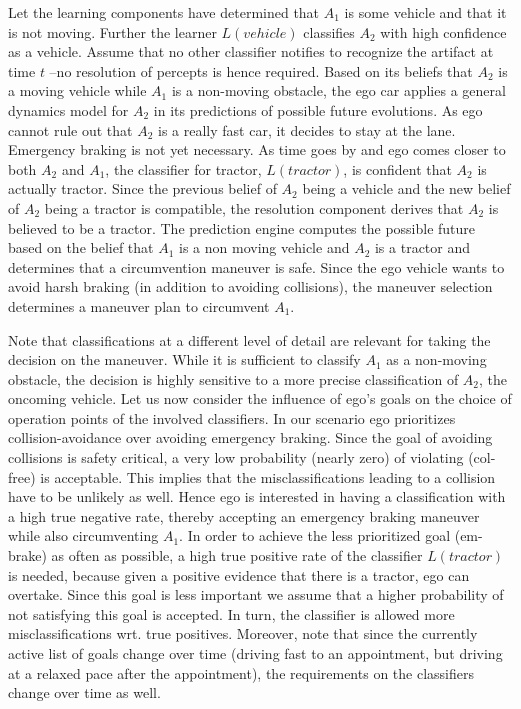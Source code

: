 Let the learning components have determined
 that $A_1$ is some vehicle and that it is not moving. 
Further the learner $L(vehicle)$ classifies $A_2$  with high confidence as a vehicle. Assume that no other classifier notifies to recognize the artifact at time $t$ --no resolution of percepts is hence required. 
Based on its beliefs that $A_2$ is a moving vehicle while $A_1$ is a non-moving obstacle, the ego car applies a general dynamics model for $A_2$ in its predictions of possible future evolutions. As ego cannot rule out that $A_2$ is a really fast car, it decides to stay at the lane. Emergency braking is not yet necessary. As time goes by and ego comes closer to both $A_2$ and $A_1$, the classifier for tractor, $L (tractor)$, is confident that  $A_2$ is actually tractor.
Since the previous belief of $A_2$ being a vehicle and the new belief of $A_2$ being a tractor is compatible, the resolution component derives that $A_2$ is believed to be a tractor. The prediction engine computes the possible future based on the belief that $A_1$ is a  non moving vehicle and $A_2$ is a tractor and determines that a circumvention maneuver is safe. Since the ego vehicle wants to avoid harsh braking (in addition to avoiding collisions), the maneuver selection determines a maneuver plan to circumvent $A_1$.

Note that classifications at a different level of detail are relevant for taking the decision on the maneuver. While it is sufficient to classify $A_1$ as a non-moving obstacle, the decision is highly sensitive to a more precise classification of $A_2$, the oncoming vehicle.
%
Let us now consider the influence of ego's goals on the choice of operation points of the involved classifiers. In our scenario ego prioritizes collision-avoidance over avoiding emergency braking. Since the goal of avoiding collisions is safety critical, a very low probability (nearly zero) of violating (col-free) is acceptable. 
This implies that the misclassifications leading to a collision have to be unlikely as well. Hence ego is interested in having a classification with a high true negative rate, thereby accepting an emergency braking maneuver while also circumventing $A_1$.
In order to achieve the less prioritized goal (em-brake) as often as possible, a high true positive rate of the classifier  $L(tractor)$ is needed, because given a positive evidence that there is a tractor, ego can overtake. Since this goal is less important we assume that a higher probability of not satisfying this goal is accepted. In turn, the classifier is allowed more misclassifications wrt. true positives.  
%
Moreover, note that since the currently active list of goals change over time (driving fast to an appointment, but driving at a  relaxed pace after the appointment), the requirements on the classifiers change over time as well.  


